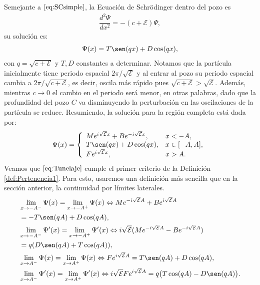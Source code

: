 \documentclass[12pt]{article}
\theoremstyle{definition}
\begin{document}
Semejante a $\eqref{eq:SCsimple}$, la Ecuación de Schrödinger dentro del pozo es 
\begin{align*}
    \dfrac{d^2\Psi}{dx^2} = -(c+\mathcal{E})\Psi,
\end{align*}
su solución es:
\begin{align*}
    \Psi(x) = T\sen(qx) + D\cos(qx),
\end{align*}
con $q = \sqrt{c+\mathcal{E}}$ y $T,D$ constantes a determinar. Notamos que la partícula inicialmente tiene periodo espacial $2\pi/\sqrt{\mathcal{E}}$ y al entrar al pozo su periodo espacial cambia a $2\pi/\sqrt{c+\mathcal{E}}$, es decir, oscila más rápido pues $\sqrt{c+\mathcal{E}} > \sqrt{\mathcal{E}}$. Además, mientras $c\rightarrow 0$ el cambio en el periodo será menor, en otras palabras, dado que la profundidad del pozo $C$ va disminuyendo la perturbación en las oscilaciones de la partícula se reduce.
Resumiendo, la solución para la región completa está dada por:
\begin{align}
        \Psi(x) = 
        \left\{ \begin{array}{ll}
        Me^{i\sqrt{\mathcal{E}}x}+Be^{-i\sqrt{\mathcal{E}}x}, & x<-A,
        \\
        T\sen(qx) + D\cos(qx), & x \in [-A,A],
        \\ Fe^{i\sqrt{\mathcal{E}}x},& x > A.
        \end{array}
        \right.
        \label{eq:Tunelaje}
\end{align}
Veamos que $\eqref{eq:Tunelaje}$ cumple el primer criterio de la Definición \ref{def:Pertenencia1}. Para esto, usaremos una definición más sencilla que en  la sección anterior, la continuidad por límites laterales.
\begin{align}
    & \lim_{x\to-A^{-}}\Psi(x) = \lim_{x\to-A^{+}}\Psi(x) 
    \Leftrightarrow 
    Me^{-i\sqrt{\mathcal{E}}A}+Be^{i\sqrt{\mathcal{E}}A} \\ & = -T\sen(qA) + D\cos(qA) ,
    \label{eq:ec3}
    \\
     & \lim_{x\to-A^{-}}\Psi'(x) = \lim_{x\to-A^{+}}\Psi'(x) 
     \Leftrightarrow 
     i\sqrt{\mathcal{E}}( Me^{-i\sqrt{\mathcal{E}}A}-Be^{-i\sqrt{\mathcal{E}}A}) 
    \\ & =
     q(D\sen(qA) + T\cos(qA)),
     \label{eq:ec4}
     \\
     & \lim_{x\to A^{-}}\Psi(x) = \lim_{x\to A^{+}}\Psi(x)
     \Leftrightarrow 
     Fe^{i\sqrt{\mathcal{E}}A} =
     T\sen(qA) + D\cos(qA),
     \label{eq:ecu1}
     \\
     & \lim_{x\to A^{-}}\Psi'(x) = \lim_{x\to A^{+}}\Psi'(x) 
     \Leftrightarrow 
     i\sqrt{\mathcal{E}}Fe^{i\sqrt{\mathcal{E}}A}
     = 
     q\big(T\cos(qA) - D\sen(qA)\big).
     \label{eq:ecu2}
\end{align}
\end{document}

